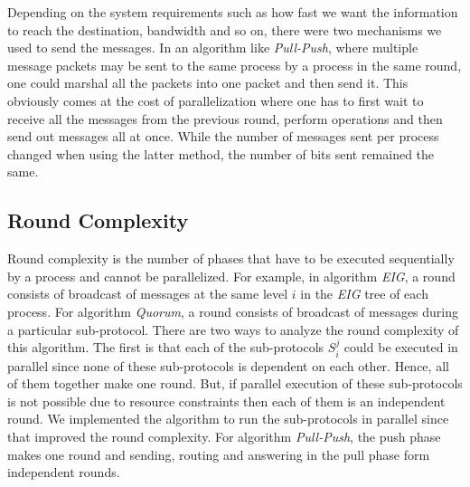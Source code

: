     Depending on the system requirements such as how fast we want the information to reach the destination, bandwidth and so on, there were two mechanisms we used to send the messages. In an algorithm like \textit{Pull-Push}, where multiple message packets may be sent to the same process by a process in the same round, one could marshal all the packets into one packet and then send it. This obviously comes at the cost of parallelization where one has to first wait to receive all the messages from the previous round, perform operations and then send out messages all at once. While the number of messages sent per process changed when using the latter method, the number of bits sent remained the same.


\subsection{Round Complexity}
Round complexity is the number of phases that have to be executed sequentially by a process and cannot be parallelized. For example, in algorithm \textit{EIG}, a round consists of broadcast of messages at the same level $i$ in the \textit{EIG} tree of each process. For algorithm \textit{Quorum}, a round consists of broadcast of messages during a particular sub-protocol. There are two ways to analyze the round complexity of this algorithm. The first is that each of the sub-protocols $S_i^j$ could be executed in parallel since none of these sub-protocols is dependent on each other. Hence, all of them together make one round. But, if parallel execution of these sub-protocols is not possible due to resource constraints then each of them is an independent round. We implemented the algorithm to run the sub-protocols in parallel since that improved the round complexity. For algorithm \textit{Pull-Push}, the push phase makes one round and sending, routing and answering in the pull phase form independent rounds.


